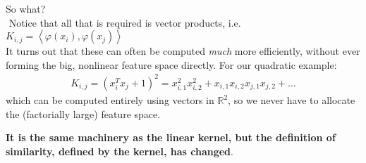 So what? \pause{}\\ $ $
Notice that all that is required is vector products, i.e. $K_{i,j} =  \left\langle \varphi(x_i),\varphi(x_j) \right\rangle $ \\$ $\\ It turns out that these can often be computed \emph{much} more efficiently, without ever forming the big, nonlinear feature space directly. \pause{}For our quadratic example:
\begin{align*}
K_{i,j} = \left(x_i^Tx_j +1\right)^2 = x_{i,1}^2x_{i,2}^2  + x_{i,1}x_{i,2}x_{j,1}x_{j,2} + \hdots 
\end{align*}
\pause{}
which {can be computed entirely using vectors in} $\mathbb{R}^2$, so we never have to allocate the (factorially large) feature space.\\
\pause{}
\begin{center}
\textbf{It is the same machinery as the linear kernel, but the definition of similarity, defined by the kernel, has changed}.
\end{center}
